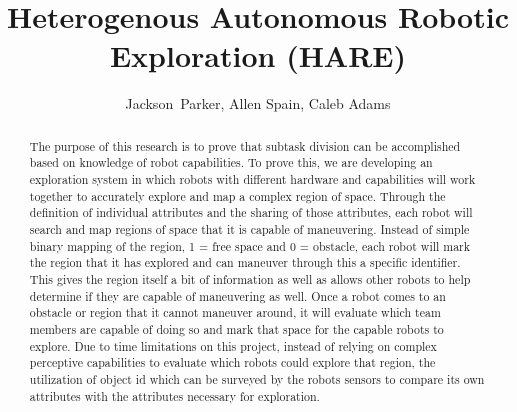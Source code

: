 \documentclass[conference]{IEEEtran}
\begin{document}
\title{Heterogenous Autonomous Robotic Exploration (HARE)}

\author{Jackson~Parker, Allen Spain, Caleb Adams}












\maketitle
\thispagestyle{plain}
\pagestyle{plain}

\begin{abstract}
  The purpose of this research is to prove that subtask division can be accomplished based on knowledge of robot capabilities. To prove this, we are developing an exploration system in which robots with different hardware and capabilities will work together to accurately explore and map a complex region of space. Through the definition of individual attributes and the sharing of those attributes, each robot will search and map regions of space that it is capable of maneuvering. Instead of simple binary mapping of the region, 1 = free space and 0 = obstacle, each robot will mark the region that it has explored and can maneuver through this a specific identifier. This gives the region itself a bit of information as well as allows other robots to help determine if they are capable of maneuvering as well.
  Once a robot comes to an obstacle or region that it cannot maneuver around, it will evaluate which team members are capable of doing so and mark that space for the capable robots to explore. Due to time limitations on this project, instead of relying on complex perceptive capabilities to evaluate which robots could explore that region, the utilization of object id which can be surveyed by the robots sensors to compare its own attributes with the attributes necessary for exploration.
\end{abstract}
\end{document}
